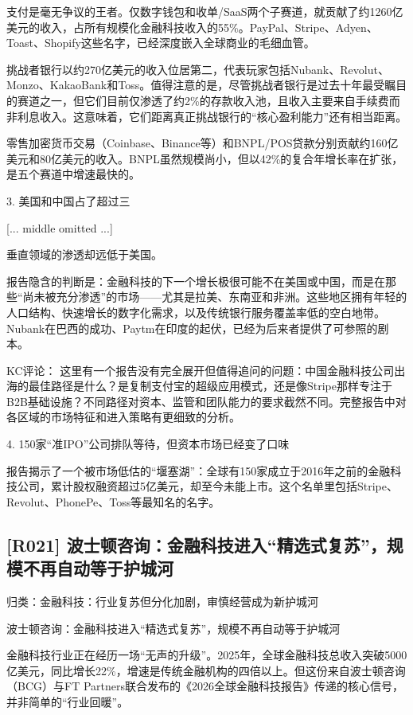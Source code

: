 \documentclass[11pt]{ctexart}
\begin{document}
支付是毫无争议的王者。仅数字钱包和收单/SaaS两个子赛道，就贡献了约1260亿美元的收入，占所有规模化金融科技收入的55\%。PayPal、Stripe、Adyen、Toast、Shopify这些名字，已经深度嵌入全球商业的毛细血管。

挑战者银行以约270亿美元的收入位居第二，代表玩家包括Nubank、Revolut、Monzo、KakaoBank和Toss。值得注意的是，尽管挑战者银行是过去十年最受瞩目的赛道之一，但它们目前仅渗透了约2\%的存款收入池，且收入主要来自手续费而非利息收入。这意味着，它们距离真正挑战银行的“核心盈利能力”还有相当距离。

零售加密货币交易（Coinbase、Binance等）和BNPL/POS贷款分别贡献约160亿美元和80亿美元的收入。BNPL虽然规模尚小，但以42\%的复合年增长率在扩张，是五个赛道中增速最快的。

3. 美国和中国占了超过三

[... middle omitted ...]

垂直领域的渗透却远低于美国。

报告隐含的判断是：金融科技的下一个增长极很可能不在美国或中国，而是在那些“尚未被充分渗透”的市场——尤其是拉美、东南亚和非洲。这些地区拥有年轻的人口结构、快速增长的数字化需求，以及传统银行服务覆盖率低的空白地带。Nubank在巴西的成功、Paytm在印度的起伏，已经为后来者提供了可参照的剧本。

KC评论： 这里有一个报告没有完全展开但值得追问的问题：中国金融科技公司出海的最佳路径是什么？是复制支付宝的超级应用模式，还是像Stripe那样专注于B2B基础设施？不同路径对资本、监管和团队能力的要求截然不同。完整报告中对各区域的市场特征和进入策略有更细致的分析。

4. 150家“准IPO”公司排队等待，但资本市场已经变了口味

报告揭示了一个被市场低估的“堰塞湖”：全球有150家成立于2016年之前的金融科技公司，累计股权融资超过5亿美元，却至今未能上市。这个名单里包括Stripe、Revolut、PhonePe、Toss等最知名的名字。

\subsection{[R021] 波士顿咨询：金融科技进入“精选式复苏”，规模不再自动等于护城河}
{\small\color{refgray}归类：金融科技：行业复苏但分化加剧，审慎经营成为新护城河}

波士顿咨询：金融科技进入“精选式复苏”，规模不再自动等于护城河

金融科技行业正在经历一场“无声的升级”。2025年，全球金融科技总收入突破5000亿美元，同比增长22\%，增速是传统金融机构的四倍以上。但这份来自波士顿咨询（BCG）与FT Partners联合发布的《2026全球金融科技报告》传递的核心信号，并非简单的“行业回暖”。
\end{document}
